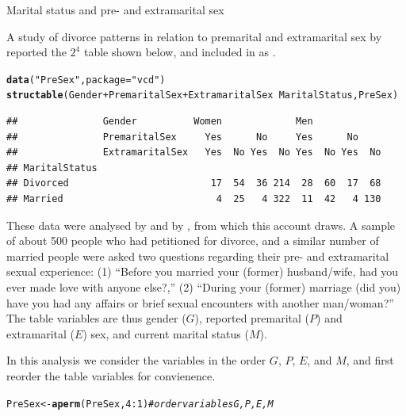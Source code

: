 \documentclass[11pt]{book}\usepackage[]{graphicx}\usepackage[]{color}
\makeatletter
\newcommand{\hlnum}[1]{\textcolor[rgb]{0.686,0.059,0.569}{#1}}%
\newcommand{\hlstr}[1]{\textcolor[rgb]{0.192,0.494,0.8}{#1}}%
\newcommand{\hlcom}[1]{\textcolor[rgb]{0.678,0.584,0.686}{\textit{#1}}}%
\newcommand{\hlopt}[1]{\textcolor[rgb]{0,0,0}{#1}}%
\newcommand{\hlstd}[1]{\textcolor[rgb]{0.345,0.345,0.345}{#1}}%
\newcommand{\hlkwb}[1]{\textcolor[rgb]{0.69,0.353,0.396}{#1}}%
\newcommand{\hlkwc}[1]{\textcolor[rgb]{0.333,0.667,0.333}{#1}}%
\newcommand{\hlkwd}[1]{\textcolor[rgb]{0.737,0.353,0.396}{\textbf{#1}}}%
\newenvironment{kframe}{%
 \def\at@end@of@kframe{}%
 \ifinner\ifhmode%
  \def\at@end@of@kframe{\end{minipage}}%
  \begin{minipage}{\columnwidth}%
 \fi\fi%
 \def\FrameCommand##1{\hskip\@totalleftmargin \hskip-\fboxsep
 \colorbox{shadecolor}{##1}\hskip-\fboxsep
     \hskip-\linewidth \hskip-\@totalleftmargin \hskip\columnwidth}%
 \MakeFramed {\advance\hsize-\width
   \@totalleftmargin\z@ \linewidth\hsize
   \@setminipage}}%
 {\par\unskip\endMakeFramed%
 \at@end@of@kframe}
\newenvironment{knitrout}{}{} %
\renewenvironment{knitrout}{\small\renewcommand{\baselinestretch}{.85}}{} %
\makeatother
\begin{document}
\begin{Example}[marital1]{Marital status and pre- and extramarital sex}

A study of divorce patterns in relation to premarital and extramarital sex
by \citet{ThornesCollard:79} reported
the \(2^4\) table shown below, and included in  as
.

\begin{knitrout}
\color{fgcolor}\begin{kframe}
\begin{alltt}
\hlkwd{data}\hlstd{(}\hlstr{"PreSex"}\hlstd{,} \hlkwc{package}\hlstd{=}\hlstr{"vcd"}\hlstd{)}
\hlkwd{structable}\hlstd{(Gender}\hlopt{+}\hlstd{PremaritalSex}\hlopt{+}\hlstd{ExtramaritalSex} \hlopt{~} \hlstd{MaritalStatus, PreSex)}
\end{alltt}
\begin{verbatim}
##               Gender          Women             Men            
##               PremaritalSex     Yes      No     Yes      No    
##               ExtramaritalSex   Yes  No Yes  No Yes  No Yes  No
## MaritalStatus                                                  
## Divorced                         17  54  36 214  28  60  17  68
## Married                           4  25   4 322  11  42   4 130
\end{verbatim}
\end{kframe}
\end{knitrout}


These data were analysed by \citet[\S 7.2.4]{Agresti:90}
and by \citet{Friendly:94a,Friendly:00:VCD}, from which this account draws.
A sample of
about 500 people who had petitioned for divorce, and a similar number
of married people were asked two questions regarding their pre- and
extramarital sexual experience:  (1) ``Before you married your
(former) husband/wife, had you ever made love with anyone else?,''
(2) ``During your (former) marriage (did you) have you had any
affairs or brief sexual encounters with another man/woman?'' 
The
table variables are thus gender ($G$), reported premarital ($P$)
and extramarital ($E$) sex, and current marital status ($M$).

In this analysis we consider the variables in the order $G$, $P$,
$E$, and $M$, and first reorder the table variables for
convienence.
\begin{knitrout}
\color{fgcolor}\begin{kframe}
\begin{alltt}
\hlstd{PreSex} \hlkwb{<-} \hlkwd{aperm}\hlstd{(PreSex,} \hlnum{4}\hlopt{:}\hlnum{1}\hlstd{)}   \hlcom{# order variables G, P, E, M}
\end{alltt}
\end{kframe}
\end{knitrout}




\end{Example}
\end{document}

